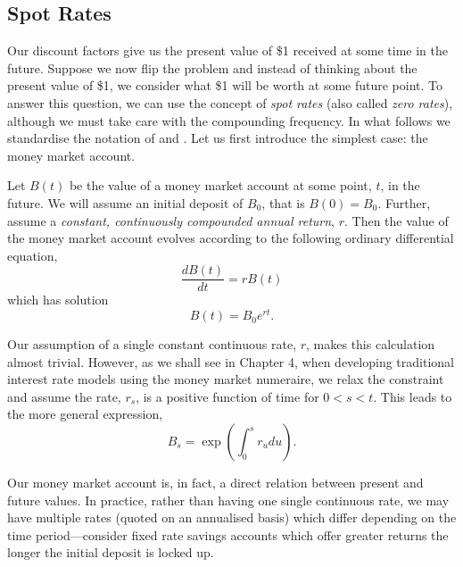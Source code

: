 \subsection{Spot Rates}

Our discount factors give us the present value of \$1 received at some time in the future. Suppose we now flip the problem and instead of thinking about the present value of \$1, we consider what \$1 will be worth at some future point. To answer this question, we can use the concept of \textit{spot rates} (also called \textit{zero rates}), although we must take care with the compounding frequency. In what follows we standardise the notation of \cite{sadr2009interest} and \cite{brigo2001interest}. Let us first introduce the simplest case: the money market account.

\begin{definition}
\label{money_market}
    Let $B(t)$ be the value of a money market account at some point, $t$, in the future. We will assume an initial deposit of $B_0$, that is $B(0) = B_0$. Further, assume a \textit{constant, continuously compounded annual return}, $r$. Then the value of the money market account evolves according to the following ordinary differential equation,
    \begin{equation}
        \frac{dB(t)}{dt} = r B(t)
    \end{equation}
    which has solution
    \begin{equation}
        B(t) = B_0 e^{rt}.
    \end{equation}
\end{definition}
Our assumption of a single constant continuous rate, $r$, makes this calculation almost trivial. However, as we shall see in Chapter 4, when developing traditional interest rate models using the money market numeraire, we relax the constraint and assume the rate, $r_s$, is a positive function of time for $0 < s < t$. This leads to the more general expression,
\begin{equation}
    B_s = \exp \left( \int_0^s r_u du \right).
\end{equation}

Our money market account is, in fact, a direct relation between present and future values. In practice, rather than having one single continuous rate, we may have multiple rates (quoted on an annualised basis) which differ depending on the time period––consider fixed rate savings accounts which offer greater returns the longer the initial deposit is locked up.

